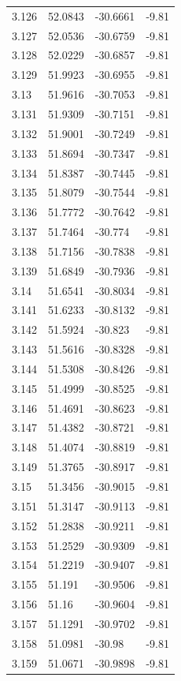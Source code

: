 \begin{tabular}{llll}
3.126 & 52.0843 & -30.6661 & -9.81 \\
3.127 & 52.0536 & -30.6759 & -9.81 \\
3.128 & 52.0229 & -30.6857 & -9.81 \\
3.129 & 51.9923 & -30.6955 & -9.81 \\
3.13 & 51.9616 & -30.7053 & -9.81 \\
3.131 & 51.9309 & -30.7151 & -9.81 \\
3.132 & 51.9001 & -30.7249 & -9.81 \\
3.133 & 51.8694 & -30.7347 & -9.81 \\
3.134 & 51.8387 & -30.7445 & -9.81 \\
3.135 & 51.8079 & -30.7544 & -9.81 \\
3.136 & 51.7772 & -30.7642 & -9.81 \\
3.137 & 51.7464 & -30.774 & -9.81 \\
3.138 & 51.7156 & -30.7838 & -9.81 \\
3.139 & 51.6849 & -30.7936 & -9.81 \\
3.14 & 51.6541 & -30.8034 & -9.81 \\
3.141 & 51.6233 & -30.8132 & -9.81 \\
3.142 & 51.5924 & -30.823 & -9.81 \\
3.143 & 51.5616 & -30.8328 & -9.81 \\
3.144 & 51.5308 & -30.8426 & -9.81 \\
3.145 & 51.4999 & -30.8525 & -9.81 \\
3.146 & 51.4691 & -30.8623 & -9.81 \\
3.147 & 51.4382 & -30.8721 & -9.81 \\
3.148 & 51.4074 & -30.8819 & -9.81 \\
3.149 & 51.3765 & -30.8917 & -9.81 \\
3.15 & 51.3456 & -30.9015 & -9.81 \\
3.151 & 51.3147 & -30.9113 & -9.81 \\
3.152 & 51.2838 & -30.9211 & -9.81 \\
3.153 & 51.2529 & -30.9309 & -9.81 \\
3.154 & 51.2219 & -30.9407 & -9.81 \\
3.155 & 51.191 & -30.9506 & -9.81 \\
3.156 & 51.16 & -30.9604 & -9.81 \\
3.157 & 51.1291 & -30.9702 & -9.81 \\
3.158 & 51.0981 & -30.98 & -9.81 \\
3.159 & 51.0671 & -30.9898 & -9.81 \\

\end{tabular}
